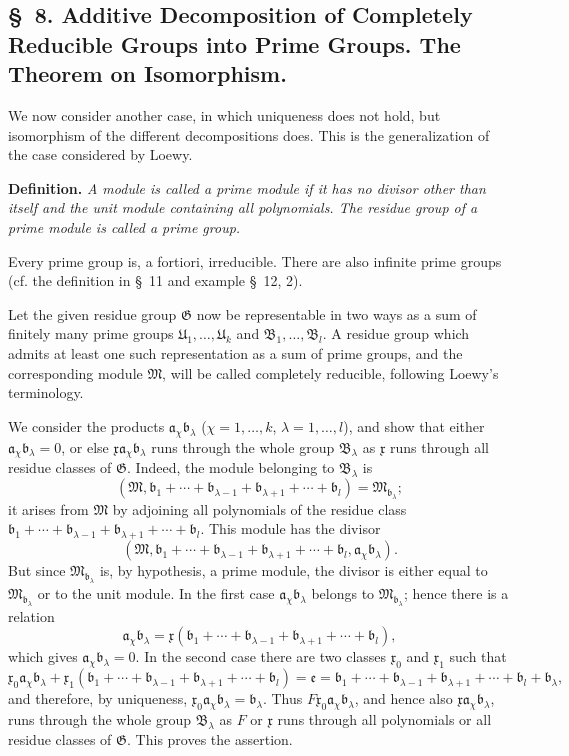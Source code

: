 \documentclass[11pt]{article}
\newcommand{\mM}{\mathfrak{M}}
\newcommand{\mG}{\mathfrak{G}}
\newcommand{\mB}{\mathfrak{B}}
\newcommand{\ma}{\mathfrak{a}}
\newcommand{\mb}{\mathfrak{b}}
\newcommand{\mx}{\mathfrak{x}}
\newcommand{\me}{\mathfrak{e}}
\providecommand{\mU}{\mathfrak{U}}
\begin{document}
\subsection*{\S~8. Additive Decomposition of Completely Reducible Groups into Prime Groups. The Theorem on Isomorphism.}

We now consider another case, in which uniqueness does not hold, but isomorphism of the different decompositions does. This is the generalization of the case considered by Loewy.

\textbf{Definition.} \emph{A module is called a prime module if it has no divisor other than itself and the unit module containing all polynomials. The residue group of a prime module is called a prime group.}

Every prime group is, a fortiori, irreducible. There are also infinite prime groups (cf. the definition in \S~11 and example \S~12, 2).

Let the given residue group $\mG$ now be representable in two ways as a sum of finitely many prime groups $\mU_1,
\ldots,\mU_k$ and $\mB_1,
\ldots,\mB_l$. A residue group which admits at least one such representation as a sum of prime groups, and the corresponding module $\mM$, will be called completely reducible, following Loewy's terminology.

We consider the products $\ma_\chi\mb_\lambda$ ($\chi=1,
\ldots,k$, $\lambda=1,
\ldots,l$), and show that either $\ma_\chi\mb_\lambda=0$, or else $\mx\ma_\chi\mb_\lambda$ runs through the whole group $\mB_\lambda$ as $\mx$ runs through all residue classes of $\mG$. Indeed, the module belonging to $\mB_\lambda$ is
\[
 (\mM,\mb_1+\cdots+\mb_{\lambda-1}+\mb_{\lambda+1}+\cdots+\mb_l)=\mM_{\mb_\lambda};
\]
it arises from $\mM$ by adjoining all polynomials of the residue class $\mb_1+
\cdots+\mb_{\lambda-1}+\mb_{\lambda+1}+\cdots+\mb_l$. This module has the divisor
\[
 (\mM,\mb_1+\cdots+\mb_{\lambda-1}+\mb_{\lambda+1}+\cdots+\mb_l,
 \ma_\chi\mb_\lambda).
\]
But since $\mM_{\mb_\lambda}$ is, by hypothesis, a prime module, the divisor is either equal to $\mM_{\mb_\lambda}$ or to the unit module. In the first case $\ma_\chi\mb_\lambda$ belongs to $\mM_{\mb_\lambda}$; hence there is a relation
\[
 \ma_\chi\mb_\lambda=\mx(\mb_1+
\cdots+\mb_{\lambda-1}+\mb_{\lambda+1}+\cdots+\mb_l),
\]
which gives $\ma_\chi\mb_\lambda=0$. In the second case there are two classes $\mx_0$ and $\mx_1$ such that
\[
 \mx_0\ma_\chi\mb_\lambda
 +\mx_1(\mb_1+\cdots+\mb_{\lambda-1}+\mb_{\lambda+1}+\cdots+\mb_l)
 =\me=\mb_1+\cdots+\mb_{\lambda-1}+\mb_{\lambda+1}+\cdots+\mb_l+\mb_\lambda,
\]
and therefore, by uniqueness, $\mx_0\ma_\chi\mb_\lambda=\mb_\lambda$. Thus $F\mx_0\ma_\chi\mb_\lambda$, and hence also $\mx\ma_\chi\mb_\lambda$, runs through the whole group $\mB_\lambda$ as $F$ or $\mx$ runs through all polynomials or all residue classes of $\mG$. This proves the assertion.
\end{document}
